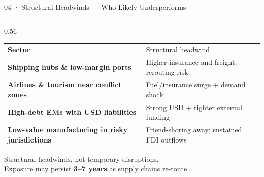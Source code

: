 \documentclass[aspectratio=169,10pt]{beamer}
\begin{document}
\begin{frame}{04 · Structural Headwinds — Who Likely Underperforms}
\begin{columns}[T,totalwidth=\textwidth]

\begin{column}{0.56\textwidth}
\renewcommand{\arraystretch}{1.38}
\setlength{\tabcolsep}{4pt}
\begin{tabular}{>{\small\bfseries}p{3.0cm}%
                >{\footnotesize}p{3.80cm}}
  \rowcolor{navy}
    \color{white}Sector & \color{white}Structural headwind \\
  \rowcolor{ice}
    Shipping hubs \& low-margin ports &
    Higher insurance and freight; rerouting risk \\
  Airlines \& tourism near conflict zones &
    Fuel/insurance surge + demand shock \\
  \rowcolor{ice}
    High-debt EMs with USD liabilities &
    Strong USD + tighter external funding \\
  Low-value manufacturing in risky jurisdictions &
    Friend-shoring away; sustained FDI outflows \\
\end{tabular}
\vspace{6pt}
{\footnotesize\color{coal}
  Structural headwinds, not temporary disruptions.\\
  Exposure may persist \textbf{3–7 years} as supply chains re-route.}
\end{column}


\end{columns}
\end{frame}
\end{document}
